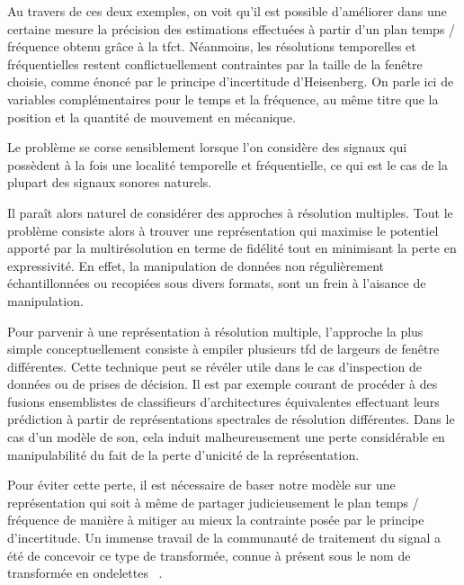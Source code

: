 Au travers de ces deux exemples, on voit qu'il est possible d'améliorer dans une certaine mesure la précision des estimations effectuées à partir d'un plan temps / fréquence obtenu grâce à la tfct. Néanmoins, les résolutions temporelles et fréquentielles restent conflictuellement contraintes par la taille de la fenêtre choisie, comme énoncé par le principe d'incertitude d'Heisenberg. On parle ici de variables complémentaires pour le temps et la fréquence, au même titre que la position et la quantité de mouvement en mécanique.

Le problème se corse sensiblement lorsque l'on considère des signaux qui possèdent à la fois une localité temporelle et fréquentielle, ce qui est le cas de la plupart des signaux sonores naturels.

Il paraît alors naturel de considérer des approches à résolution multiples. Tout le problème consiste alors à trouver une représentation qui maximise le potentiel apporté par la multirésolution en terme de fidélité tout en minimisant la perte en expressivité. En effet, la manipulation de données non régulièrement échantillonnées ou recopiées sous divers formats, sont un frein à l'aisance de manipulation.


Pour parvenir à une représentation à résolution multiple, l'approche la plus simple conceptuellement consiste à \og empiler \fg plusieurs tfd de largeurs de fenêtre différentes. Cette technique peut se révéler utile dans le cas d'inspection de données ou de prises de décision. Il est par exemple courant de procéder à des fusions ensemblistes de classifieurs d'architectures équivalentes effectuant leurs prédiction à partir de représentations spectrales de résolution différentes. Dans le cas d'un modèle de son, cela induit malheureusement une perte considérable en manipulabilité du fait de la perte d'unicité de la représentation.

Pour éviter cette perte, il est nécessaire de baser notre modèle sur une représentation qui soit à même de partager judicieusement le plan temps / fréquence de manière à mitiger au mieux la contrainte posée par le principe d'incertitude. Un immense travail de la communauté de traitement du signal a été de concevoir ce type de transformée, connue à présent sous le nom de transformée en \og ondelettes \fg~\cite{mallat1989theory}.

